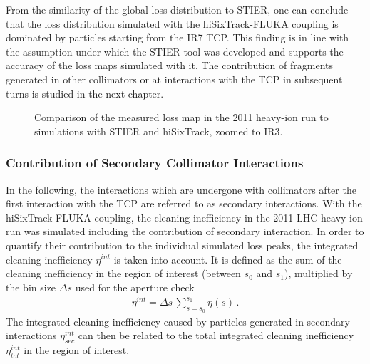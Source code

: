 From the similarity of the global loss distribution to STIER, one can conclude that the loss distribution simulated with the hiSixTrack-FLUKA coupling is dominated by particles starting from the IR7 TCP. This finding is in line with the assumption under which the STIER tool was developed and supports the accuracy of the loss maps simulated with it. The contribution of fragments generated in other collimators or at interactions with the TCP in subsequent turns is studied in the next chapter. 



\begin{figure}[t]
  \centering
  \footnotesize
  \caption{Comparison of the measured loss map in the 2011 heavy-ion run to simulations with STIER and hiSixTrack, zoomed to IR3.}  
  \label{pic:16042501}
  \end{figure}

\newpage

\subsubsection{Contribution of Secondary Collimator Interactions}

In the following, the interactions which are undergone with collimators after the first interaction with the TCP are referred to as secondary interactions. With the hiSixTrack-FLUKA coupling, the cleaning inefficiency in the 2011 LHC heavy-ion run was simulated including the contribution of secondary interaction. In order to quantify their contribution to the individual simulated loss peaks, the integrated cleaning inefficiency $\eta^{int}$ is taken into account. It is defined as the sum of the cleaning inefficiency in the region of interest (between $s_0$ and $s_1$), multiplied by the bin size $\Delta s$ used for the aperture check
%
\begin{align}
  \eta^{int} =  \Delta s \,  \sum_{s=s_0}^{s_1} \eta(s) \, .
\end{align}
%
The integrated cleaning inefficiency caused by particles generated in secondary interactions $\eta_{sec}^{int}$ can then be related to the total integrated cleaning inefficiency $\eta_{tot}^{int}$ in the region of interest.


